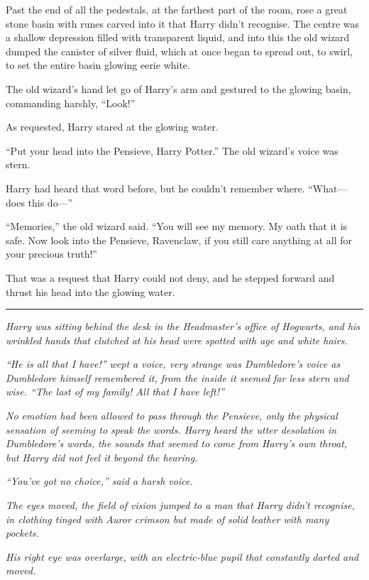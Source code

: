 Past the end of all the pedestals, at the farthest part of the room,
rose a great stone basin with runes carved into it that Harry didn't
recognise. The centre was a shallow depression filled with transparent
liquid, and into this the old wizard dumped the canister of silver
fluid, which at once began to spread out, to swirl, to set the entire
basin glowing eerie white.

The old wizard's hand let go of Harry's arm and gestured to the glowing
basin, commanding harshly, ``Look!''

As requested, Harry stared at the glowing water.

``Put your head into the Pensieve, Harry Potter.'' The old wizard's
voice was stern.

Harry had heard that word before, but he couldn't remember where.
``What---does this do---''

``Memories,'' the old wizard said. ``You will see my memory. My oath
that it is safe. Now look into the Pensieve, Ravenclaw, if you still
care anything at all for your precious truth!''

That was a request that Harry could not deny, and he stepped forward and
thrust his head into the glowing water.

\begin{center}\rule{3in}{0.4pt}\end{center}

\emph{Harry was sitting behind the desk in the Headmaster's office of
Hogwarts, and his wrinkled hands that clutched at his head were spotted
with age and white hairs.}

\emph{``He is all that I have!'' wept a voice, very strange was
Dumbledore's voice as Dumbledore himself remembered it, from the inside
it seemed far less stern and wise. ``The last of my family! All that I
have left!''}

\emph{No emotion had been allowed to pass through the Pensieve, only the
physical sensation of seeming to speak the words. Harry heard the utter
desolation in Dumbledore's words, the sounds that seemed to come from
Harry's own throat, but Harry did not feel it beyond the hearing.}

\emph{``You've got no choice,'' said a harsh voice.}

\emph{The eyes moved, the field of vision jumped to a man that Harry
didn't recognise, in clothing tinged with Auror crimson but made of
solid leather with many pockets.}

\emph{His right eye was overlarge, with an electric-blue pupil that
constantly darted and moved.}

